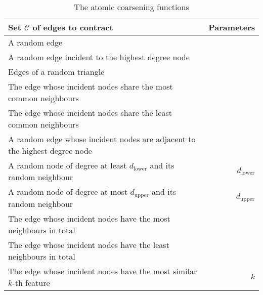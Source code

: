 \begin{table}
    \caption{The atomic coarsening functions}
    \label{tab:atomic-coarsenings}
    \begin{tabularx}{\linewidth}{Xr}
        \toprule
        \textbf{Set \( \mathcal{C} \) of edges to contract}                                                                       & \textbf{Parameters}    \\
        \midrule
        A random edge                                                                                                             &                        \\
        A random edge incident to the highest degree node                                                                         &                        \\
        Edges of a random triangle                                                                                                &                        \\
        The edge whose incident nodes share the most common neighbours                                                            &                        \\
        The edge whose incident nodes share the least common neighbours                                                           &                        \\
        A random edge whose incident nodes are adjacent to the highest degree node                                                &                        \\
        A random node of degree at least \( d_\mathrm{lower} \) and its random neighbour                                          & \( d_\mathrm{lower} \) \\
        A random node of degree at most \( d_\mathrm{upper} \) and its random neighbour                                           & \( d_\mathrm{upper} \) \\
        The edge whose incident nodes have the most neighbours in total                                                           &                        \\
        The edge whose incident nodes have the least neighbours in total                                                          &                        \\
        The edge whose incident nodes have the most similar \( k \)-th feature                                                    & \( k \)                \\

\end{tabularx}
\end{table}
